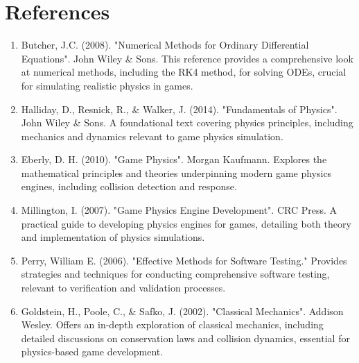 \documentclass[12pt]{article}
\begin{document}
\section{References}
\begin{enumerate}
    \item Butcher, J.C. (2008). "Numerical Methods for Ordinary Differential Equations". John Wiley \& Sons. This reference provides a comprehensive look at numerical methods, including the RK4 method, for solving ODEs, crucial for simulating realistic physics in games.
    \item Halliday, D., Resnick, R., \& Walker, J. (2014). "Fundamentals of Physics". John Wiley \& Sons. A foundational text covering physics principles, including mechanics and dynamics relevant to game physics simulation.
    \item Eberly, D. H. (2010). "Game Physics". Morgan Kaufmann. Explores the mathematical principles and theories underpinning modern game physics engines, including collision detection and response.
    \item Millington, I. (2007). "Game Physics Engine Development". CRC Press. A practical guide to developing physics engines for games, detailing both theory and implementation of physics simulations.
    \item Perry, William E. (2006). "Effective Methods for Software Testing." Provides strategies and techniques for conducting comprehensive software testing, relevant to verification and validation processes.
    \item Goldstein, H., Poole, C., \& Safko, J. (2002). "Classical Mechanics". Addison Wesley. Offers an in-depth exploration of classical mechanics, including detailed discussions on conservation laws and collision dynamics, essential for physics-based game development.
\end{enumerate}
\end{document}
